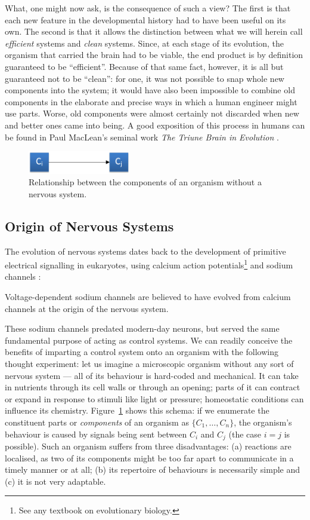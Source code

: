 What, one might now ask, is the consequence of such a view? The first is that each new feature in the developmental history had to have been useful on its own. The second is that it allows the distinction between what we will herein call \emph{efficient} systems and \emph{clean} systems. Since, at each stage of its evolution, the organism that carried the brain had to be viable, the end product is by definition guaranteed to be ``efficient''. Because of that same fact, however, it is all but guaranteed not to be ``clean'': for one, it was not possible to snap whole new components into the system; it would have also been impossible to combine old components in the elaborate and precise ways in which a human engineer might use parts. Worse, old components were almost certainly not discarded when new and better ones came into being. A good exposition of this process in humans can be found in Paul MacLean's seminal work {\em The Triune Brain in Evolution} \cite{maclean1990}.

\begin{figure}[t]
	\centering
	\includegraphics[width=0.4\textwidth]{Figs/noNervousSystem.png}
	\caption{Relationship between the components of an organism without a nervous system.}
	\label{fig:noNervousSystem}
\end{figure}
\subsection{Origin of Nervous Systems} The evolution of nervous systems dates back to the development of primitive electrical signalling in eukaryotes, using calcium action potentials\footnote{See any textbook on evolutionary biology.} and sodium channels \cite{Liebeskind31052011}:
\begin{emquote}
	Voltage-dependent sodium channels are believed to have evolved from calcium channels at the origin of the nervous system.
\end{emquote}
These sodium channels predated modern-day neurons, but served the same fundamental purpose of acting as control systems. We can readily conceive the benefits of imparting a control system onto an organism with the following thought experiment: let us imagine a microscopic organism without any sort of nervous system --- all of its behaviour is hard-coded and mechanical. It can take in nutrients through its cell walls or through an opening; parts of it can contract or expand in response to stimuli like light or pressure; homeostatic conditions can influence its chemistry. Figure~\ref{fig:noNervousSystem} shows this schema: if we enumerate the constituent parts or {\em components} of an organism as $\{C_1,\dots,C_n\}$, the organism's behaviour is caused by signals being sent between $C_i$ and $C_j$ (the case $i=j$ is possible). Such an organism suffers from three disadvantages: (a) reactions are localised, as two of its components might be too far apart to communicate in a timely manner or at all; (b) its repertoire of behaviours is necessarily simple and (c) it is not very adaptable.

